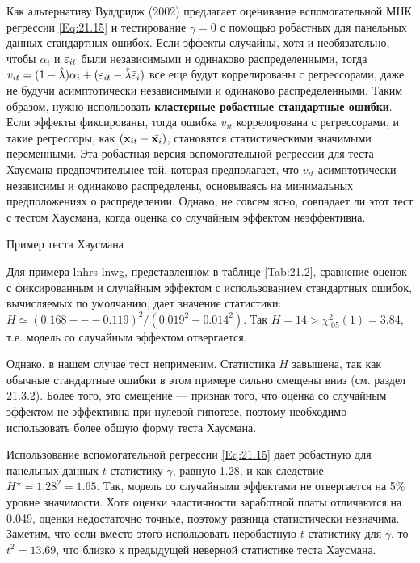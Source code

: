 Как альтернативу Вулдридж (2002) предлагает оценивание вспомогательной МНК регрессии \ref{Eq:21.15} и тестирование $\gamma=0$ с помощью робастных для панельных данных стандартных ошибок. Если эффекты случайны, хотя и необязательно, чтобы $\alpha_i$ и $\varepsilon_{it}$ были независимыми и одинаково распределенными, тогда $v_{it}=(1-\hat{\lambda})\alpha_i+(\varepsilon_{it}-\hat{\lambda}\bar{\varepsilon}_i)$ все еще будут коррелированы с регрессорами, даже не будучи асимптотически независимыми и одинаково распределенными. Таким образом, нужно использовать \textbf{кластерные робастные стандартные ошибки}. Если эффекты фиксированы, тогда ошибка  $v_{it}$ коррелирована с регрессорами, и такие регрессоры, как $(\mathbf{x}_{it}-\bar{\mathbf{x}_i})$, становятся статистическими значимыми переменными. Эта робастная версия вспомогательной регрессии для теста Хаусмана предпочтительнее той, которая предполагает, что  $v_{it}$ асимптотически независимы и одинаково распределены, основываясь на минимальных предположениях о распределении. Однако, не совсем ясно, совпадает ли этот тест с тестом Хаусмана, когда оценка со случайным эффектом неэффективна.


{\centering
Пример теста Хаусмана\\}

Для примера lnhrs-lnwg, представленном в таблице \ref{Tab:21.2}, сравнение оценок с фиксированным и случайным эффектом с использованием стандартных ошибок, вычисляемых по умолчанию, дает значение статистики: $H \simeq (0.168 --- 0.119)^2/(0.019^2-0.014^2)$. Так $H=14 > \chi^2_{.05}(1)=3.84$, т.е. модель со случайным эффектом отвергается.

Однако, в нашем случае тест неприменим. Статистика $H$ завышена, так как обычные стандартные ошибки в этом примере сильно смещены вниз (см. раздел 21.3.2). Более того, это смещение  --- признак того, что оценка со случайным эффектом не эффективна при нулевой гипотезе, поэтому необходимо использовать более общую форму теста Хаусмана.

Использование вспомогательной регрессии \ref{Eq:21.15}  дает робастную для панельных данных $t$-статистику  $\gamma$, равную 1.28, и как следствие $H*=1.28^2=1.65$. Так, модель со случайными эффектами не отвергается на 5\% уровне значимости. Хотя оценки эластичности заработной платы отличаются на 0.049, оценки недостаточно точные, поэтому разница статистически незначима. Заметим, что если вместо этого использовать неробастную $t$-статистику для $\hat{\gamma}$, то $t^2=13.69$, что близко к предыдущей неверной статистике теста Хаусмана.

